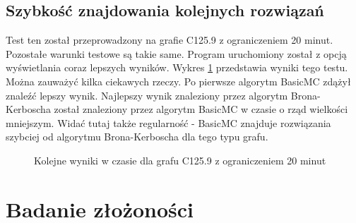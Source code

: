 \documentclass[12pt, a4paper]{article}
\begin{document}
\subsection{Szybkość znajdowania kolejnych rozwiązań}
Test ten został przeprowadzony na grafie C125.9 z ograniczeniem 20 minut. Pozostałe warunki testowe są takie same. Program uruchomiony został z opcją wyświetlania coraz lepszych wyników. Wykres \ref{fig:ProgressC125.9-20min} przedstawia wyniki tego testu. Można zauważyć kilka ciekawych rzeczy. Po pierwsze algorytm BasicMC zdążył znaleźć lepszy wynik. Najlepszy wynik znaleziony przez algorytm Brona-Kerboscha został znaleziony przez algorytm BasicMC w czasie o rząd wielkości mniejszym. Widać tutaj także regularność - BasicMC znajduje rozwiązania szybciej od algorytmu Brona-Kerboscha dla tego typu grafu.

\begin{figure}[H]
  \begin{center}
  \end{center}
  \caption{Kolejne wyniki w czasie dla grafu C125.9 z ograniczeniem 20 minut}
  \label{fig:ProgressC125.9-20min}
\end{figure}

\section{Badanie złożoności}
\end{document}

